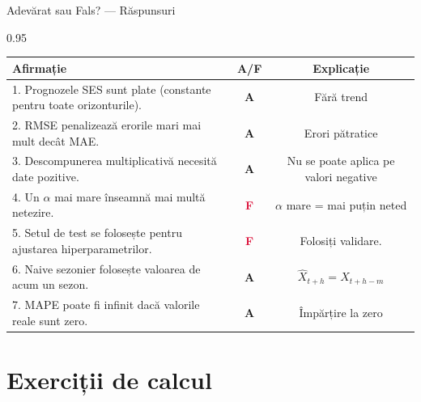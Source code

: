 \documentclass[9pt, aspectratio=169, t]{beamer}
\begin{document}
\begin{frame}{Adevărat sau Fals? --- Răspunsuri}
    \begin{cminipage}{0.95\textwidth}
    \footnotesize
    \begin{center}
    \begin{tabular}{p{7.5cm}cc}
        \toprule
        \textbf{Afirmație} & \textbf{A/F} & \textbf{Explicație} \\
        \midrule
        1. Prognozele SES sunt plate (constante pentru toate orizonturile). & \textcolor{Forest}{\textbf{A}} & {\scriptsize Fără trend} \\[0.08cm]
        2. RMSE penalizează erorile mari mai mult decât MAE. & \textcolor{Forest}{\textbf{A}} & {\scriptsize Erori pătratice} \\[0.08cm]
        3. Descompunerea multiplicativă necesită date pozitive. & \textcolor{Forest}{\textbf{A}} & {\scriptsize Nu se poate aplica pe valori negative} \\[0.08cm]
        4. Un $\alpha$ mai mare înseamnă mai multă netezire. & \textcolor{Crimson}{\textbf{F}} & {\scriptsize $\alpha$ mare = mai puțin neted} \\[0.08cm]
        5. Setul de test se folosește pentru ajustarea hiperparametrilor. & \textcolor{Crimson}{\textbf{F}} & {\scriptsize Folosiți validare.} \\[0.08cm]
        6. Naive sezonier folosește valoarea de acum un sezon. & \textcolor{Forest}{\textbf{A}} & {\scriptsize $\hat{X}_{t+h} = X_{t+h-m}$} \\[0.08cm]
        7. MAPE poate fi infinit dacă valorile reale sunt zero. & \textcolor{Forest}{\textbf{A}} & {\scriptsize Împărțire la zero} \\
        \bottomrule
    \end{tabular}
    \end{center}
    \end{cminipage}
\end{frame}

\section{Exerciții de calcul}
\end{document}

